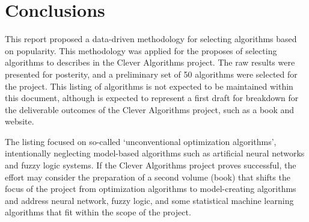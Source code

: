 \documentclass[a4paper, 11pt]{article}
\begin{document}
% 
% 
\section{Conclusions}
\label{sec:conclusions}
This report proposed a data-driven methodology for selecting algorithms based on popularity. This methodology was applied for the proposes of selecting algorithms to describes in the Clever Algorithms project. The raw results were presented for posterity, and a preliminary set of 50 algorithms were selected for the project. This listing of algorithms is not expected to be maintained within this document, although is expected to represent a first draft for breakdown for the deliverable outcomes of the Clever Algorithms project, such as a book and website. 

The listing focused on so-called `unconventional optimization algorithms', intentionally neglecting model-based algorithms such as artificial neural networks and fuzzy logic systems. If the Clever Algorithms project proves successful, the effort may consider the preparation of a second volume (book) that shifts the focus of the project from optimization algorithms to model-creating algorithms and address neural network, fuzzy logic, and some statistical machine learning algorithms that fit within the scope of the project.



\end{document}
